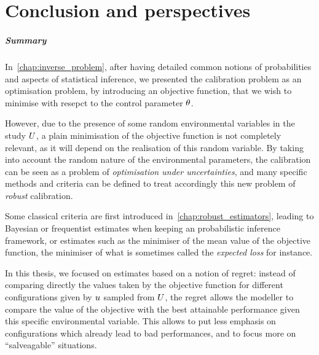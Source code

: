 \documentclass[../../Main_ManuscritThese.tex]{subfiles}
\begin{document}
\pagestyle{conclusionStyle}



\TitleBtwLines
\chapter*{Conclusion and perspectives}
{}
\label{chap:Conclusion}
\renewcommand{\thesection}{} %

\paragraph{Summary}
In~\cref{chap:inverse_problem}, after having detailed common notions
of probabilities and aspects of statistical inference, we presented
the calibration problem as an optimisation problem, by introducing an
objective function, that we wish to minimise with resepct to the
control parameter $\theta$.

However, due to the presence of some random environmental variables in
the study $U$, a plain minimisation of the objective function is not
completely relevant, as it will depend on the realisation of this
random variable.  By taking into account the random nature of the
{environmental parameters}, the calibration can be seen as a problem
of \emph{optimisation under uncertainties}, and many specific methods
and criteria can be defined to treat accordingly this new problem of
\emph{robust} calibration.


Some classical criteria are first introduced
in~\cref{chap:robust_estimators}, leading to Bayesian or frequentist
estimates when keeping an probabilistic inference framework, or
estimates such as the minimiser of the mean value of the objective
function, the minimiser of what is sometimes called the \emph{expected loss} for instance.

In this thesis, we focused on estimates based on a notion of regret:
instead of comparing directly the values taken by the objective
function for different configurations given by $u$ sampled from
$U$, the regret allows the modeller to compare the value of the
objective with the best attainable performance given this specific
environmental variable.
This allows to put less emphasis on configurations which already lead
to bad performances, and to focus more on ``salveagable'' situations.
\end{document}
